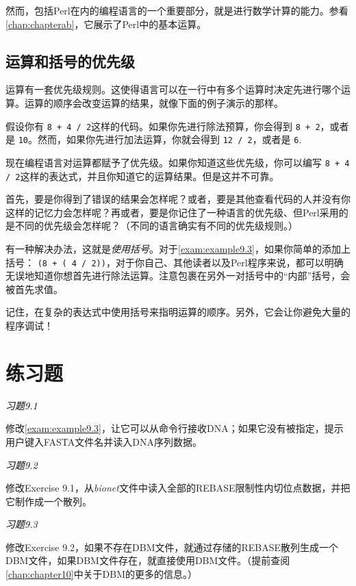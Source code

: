 然而，包括Perl在内的编程语言的一个重要部分，就是进行数学计算的能力。参看\autoref{chap:chapterab}，它展示了Perl中的基本运算。

\subsection{运算和括号的优先级}
\label{sect:section9.3.1}
运算有一套优先级规则。这使得语言可以在一行中有多个运算时决定先进行哪个运算。运算的顺序会改变运算的结果，就像下面的例子演示的那样。

假设你有 \verb|8 + 4 / 2|这样的代码。如果你先进行除法预算，你会得到 \verb|8 + 2|，或者是 \verb|10|。然而，如果你先进行加法运算，你就会得到 \verb|12 / 2|，或者是 \verb|6|.

现在编程语言对运算都赋予了优先级。如果你知道这些优先级，你可以编写 \verb|8 + 4 / 2|这样的表达式，并且你知道它的运算结果。但是这并不可靠。

首先，要是你得到了错误的结果会怎样呢？或者，要是其他查看代码的人并没有你这样的记忆力会怎样呢？再或者，要是你记住了一种语言的优先级、但Perl采用的是不同的优先级会怎样呢？（不同的语言确实有不同的优先级规则。）

有一种解决办法，这就是\textit{使用括号}。对于\autoref{exam:example9.3}，如果你简单的添加上括号： \verb|(8 + ( 4 / 2))|，对于你自己、其他读者以及Perl程序来说，都可以明确无误地知道你想首先进行除法运算。注意包裹在另外一对括号中的“内部”括号，会被首先求值。

记住，在复杂的表达式中使用括号来指明运算的顺序。另外，它会让你避免大量的程序调试！

\section{练习题}
\label{sect:section9.4}
\textcolor{black}{\textit{习题9.1}}
\begin{adjustwidth}{4em}{}
修改\autoref{exam:example9.3}，让它可以从命令行接收DNA；如果它没有被指定，提示用户键入FASTA文件名并读入DNA序列数据。
\end{adjustwidth}

\textcolor{black}{\textit{习题9.2}}
\begin{adjustwidth}{4em}{}
  修改Exercise
  9.1，从\textit{bionet}文件中读入全部的REBASE限制性内切位点数据，并把它制作成一个散列。
\end{adjustwidth}

\textcolor{black}{\textit{习题9.3}}
\begin{adjustwidth}{4em}{}
修改Exercise 9.2，如果不存在DBM文件，就通过存储的REBASE散列生成一个DBM文件，如果DBM文件存在，就直接使用DBM文件。（提前查阅\autoref{chap:chapter10}中关于DBM的更多的信息。）
\end{adjustwidth}

